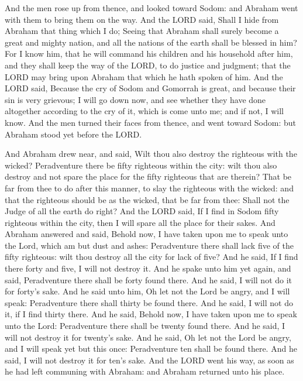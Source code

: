  And the men rose up from thence, and looked toward Sodom:
and Abraham went with them to bring them on the way.  And
the LORD said, Shall I hide from Abraham that thing which I do;
 Seeing that Abraham shall surely become a great and mighty
nation, and all the nations of the earth shall be blessed in him?
 For I know him, that he will command his children and his
household after him, and they shall keep the way of the LORD, to do
justice and judgment; that the LORD may bring upon Abraham that which he
hath spoken of him.  And the LORD said, Because the cry of
Sodom and Gomorrah is great, and because their sin is very grievous;
 I will go down now, and see whether they have done
altogether according to the cry of it, which is come unto me; and if
not, I will know.  And the men turned their faces from
thence, and went toward Sodom: but Abraham stood yet before the LORD.

 And Abraham drew near, and said, Wilt thou also destroy
the righteous with the wicked?  Peradventure there be fifty
righteous within the city: wilt thou also destroy and not spare the
place for the fifty righteous that are therein?  That be
far from thee to do after this manner, to slay the righteous with the
wicked: and that the righteous should be as the wicked, that be far from
thee: Shall not the Judge of all the earth do right?  And
the LORD said, If I find in Sodom fifty righteous within the city, then
I will spare all the place for their sakes.  And Abraham
answered and said, Behold now, I have taken upon me to speak unto the
Lord, which am but dust and ashes:  Peradventure there
shall lack five of the fifty righteous: wilt thou destroy all the city
for lack of five? And he said, If I find there forty and five, I will
not destroy it.  And he spake unto him yet again, and said,
Peradventure there shall be forty found there. And he said, I will not
do it for forty's sake.  And he said unto him, Oh let not
the Lord be angry, and I will speak: Peradventure there shall thirty be
found there. And he said, I will not do it, if I find thirty there.
 And he said, Behold now, I have taken upon me to speak
unto the Lord: Peradventure there shall be twenty found there. And he
said, I will not destroy it for twenty's sake.  And he
said, Oh let not the Lord be angry, and I will speak yet but this once:
Peradventure ten shall be found there. And he said, I will not destroy
it for ten's sake.  And the LORD went his way, as soon as
he had left communing with Abraham: and Abraham returned unto his place.

